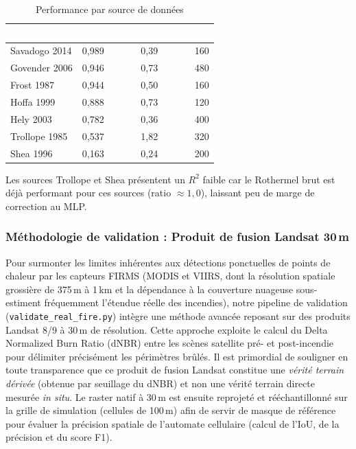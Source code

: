 \begin{table}[H]
\centering
\caption{Performance par source de données}
\begin{tabular}{|l|c|c|c|}
\hline
\rowcolor{NavyBlue} \textcolor{white}{\textbf{Source}} & \textcolor{white}{\textbf{$R^2$}} & \textcolor{white}{\textbf{MAE (m/min)}} & \textcolor{white}{\textbf{$n$}} \\
\hline
Savadogo 2014 & 0,989 & 0,39 & 160 \\
Govender 2006 & 0,946 & 0,73 & 480 \\
Frost 1987 & 0,944 & 0,50 & 160 \\
Hoffa 1999 & 0,888 & 0,73 & 120 \\
Hely 2003 & 0,782 & 0,36 & 400 \\
Trollope 1985 & 0,537 & 1,82 & 320 \\
Shea 1996 & 0,163 & 0,24 & 200 \\
\hline
\end{tabular}
\end{table}

Les sources Trollope et Shea présentent un $R^2$ faible car le Rothermel brut est déjà performant pour ces sources (ratio $\approx 1{,}0$), laissant peu de marge de correction au MLP.

\subsubsection{Méthodologie de validation : Produit de fusion Landsat 30\,m}

Pour surmonter les limites inhérentes aux détections ponctuelles de points de chaleur par les capteurs FIRMS (MODIS et VIIRS, dont la résolution spatiale grossière de 375\,m à 1\,km et la dépendance à la couverture nuageuse sous-estiment fréquemment l'étendue réelle des incendies), notre pipeline de validation (\texttt{validate\_real\_fire.py}) intègre une méthode avancée reposant sur des produits Landsat 8/9 à 30\,m de résolution. Cette approche exploite le calcul du Delta Normalized Burn Ratio (dNBR) entre les scènes satellite pré- et post-incendie pour délimiter précisément les périmètres brûlés. Il est primordial de souligner en toute transparence que ce produit de fusion Landsat constitue une \textit{vérité terrain dérivée} (obtenue par seuillage du dNBR) et non une vérité terrain directe mesurée \textit{in situ}. Le raster natif à 30\,m est ensuite reprojeté et rééchantillonné sur la grille de simulation (cellules de 100\,m) afin de servir de masque de référence pour évaluer la précision spatiale de l'automate cellulaire (calcul de l'IoU, de la précision et du score F1).

